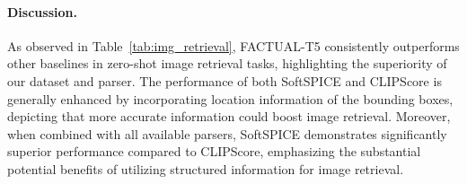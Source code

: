 \paragraph{Discussion.} 
As observed in Table~\ref{tab:img_retrieval}, FACTUAL-T5 consistently outperforms other baselines in zero-shot image retrieval tasks, highlighting the superiority of our dataset and parser. The performance of both SoftSPICE and CLIPScore is generally enhanced by incorporating location information of the bounding boxes, depicting that more accurate information could boost image retrieval. Moreover, when combined with all available parsers, SoftSPICE demonstrates significantly superior performance compared to CLIPScore, emphasizing the substantial potential benefits of utilizing structured information for image retrieval. \begin{table}[t]
\centering
    \caption{ Zero-shot image retrieval evaluation on two sets of image-caption pairs that utilize localization or do not use localization information during image retrieval.
     \vspace{-3mm} }
  \label{tab:img_retrieval}
    \vspace{-3mm}
\end{table} 
